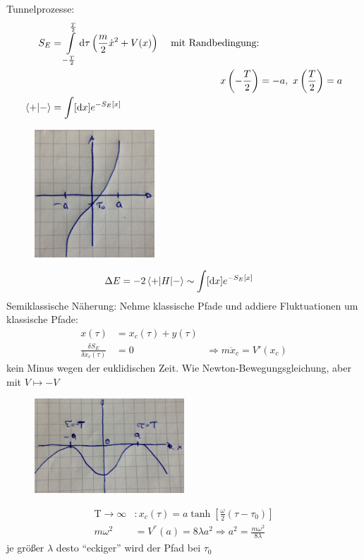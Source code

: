 Tunnelprozesse:
	\begin{align*}
		S_E &= \int \limits_{-\frac{T}{2}}^{\frac{T}{2}} \mathrm{d} \tau 
		\left(\frac{m}{2} \dot{x}^2 + V(x)\right) & \text{ mit Randbedingung:}&\\
		&&x \left(-\frac{T}{2}\right) &= -a ,~ x \left(\frac{T}{2}\right) = a \\
		\braket{+ | -} &= \int [\mathrm{d} x] e^{-S_E[x]}
	\end{align*}
	\begin{figure} [h]
		\begin{center}
			\includegraphics[width= 0.4\textwidth]{Tunneln_durch_eine_Potentialbarriere5}
		\end{center}
	\end{figure}
\FloatBarrier
	\begin{align*}
		\Delta E &= -2 \braket{+ | H | -} \sim \int [\mathrm{d} x] e^{-S_E[x]}
	\end{align*}
Semiklassische Näherung: Nehme klassische Pfade und addiere Fluktuationen um klassische Pfade: 
	\begin{align*}
		x(\tau) &= x_c(\tau) + y(\tau) \\
		\frac{\delta S_E}{\delta x_c(\tau)} &= 0
		&\Rightarrow m \ddot{x}_c = V' (x_c) 
	\end{align*}
kein Minus wegen der euklidischen Zeit. Wie Newton-Bewegungsgleichung, aber mit $V \mapsto -V$
\FloatBarrier
	\begin{figure} [h]
		\begin{center}
			\includegraphics[width= 0.5\textwidth]{Tunneln_durch_eine_Potentialbarriere6}
		\end{center}
	\end{figure}
\FloatBarrier
	\begin{align*}
		\mathrm{T} \rightarrow \infty &: 
		x_c(\tau) = a \tanh \left[\frac{\omega}{2} (\tau- \tau_0)\right] \\
		m \omega^2 &= V^{''}(a) = 8 \lambda a^2
		\Rightarrow a^2 = \frac{m \omega^2}{8 \lambda}
	\end{align*}
je größer $\lambda$ desto ``eckiger'' wird der Pfad bei $\tau_0$ 
\\

